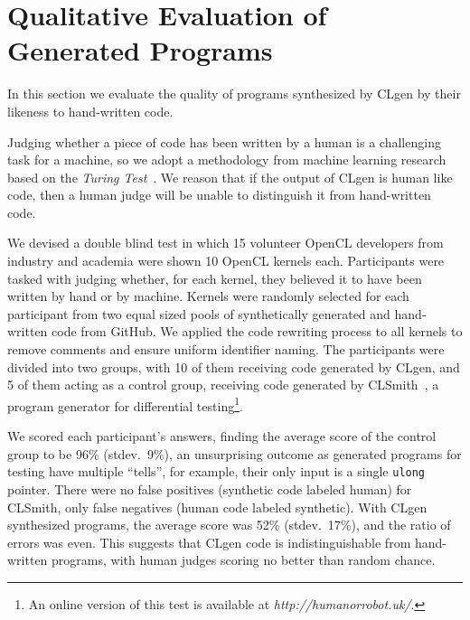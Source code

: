 \section{Qualitative Evaluation of Generated Programs}\label{sec:eval}

In this section we evaluate the quality of programs synthesized by CLgen by their likeness to hand-written code.


Judging whether a piece of code has been written by a human is a challenging task for a machine, so we adopt a methodology from machine learning research based on the \emph{Turing Test}~\cite{Gao2015a,Zhang2016,Vinyals}. We reason that if the output of CLgen is human like code, then a human judge will be unable to distinguish it from hand-written code.

We devised a double blind test in which 15 volunteer OpenCL developers from industry and academia were shown 10 OpenCL kernels each. Participants were tasked with judging whether, for each kernel, they believed it to have been written by hand or by machine. Kernels were randomly selected for each participant from two equal sized pools of synthetically generated and hand-written code from GitHub. We applied the code rewriting process to all kernels to remove comments and ensure uniform identifier naming. The participants were divided into two groups, with 10 of them receiving code generated by CLgen, and 5 of them acting as a control group, receiving code generated by CLSmith~\cite{Lidbury2015a}, a program generator for differential testing\footnote{An online version of this test is available at \emph{http://humanorrobot.uk/}.}.

We scored each participant's answers, finding the average score of the control group to be 96\% (stdev.\ 9\%), an unsurprising outcome as generated programs for testing have multiple ``tells'', for example, their only input is a single \texttt{ulong} pointer. There were no false positives (synthetic code labeled human) for CLSmith, only false negatives (human code labeled synthetic). With CLgen synthesized programs, the average score was 52\% (stdev.\ 17\%), and the ratio of errors was even. This suggests that CLgen code is indistinguishable from hand-written programs, with human judges scoring no better than random chance.
